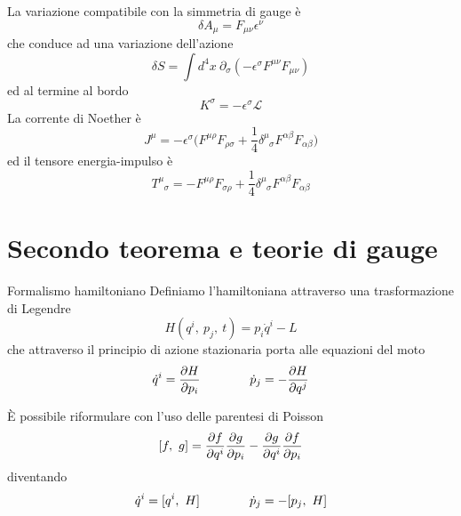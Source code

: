 \begin{frame}
    La variazione compatibile con la simmetria di gauge è 
\begin{equation*}
    \delta A_\mu = F_{\mu\nu} \epsilon^\nu
\end{equation*}
    che conduce ad una variazione dell'azione
\begin{equation*}
    \delta S = \int d^4 x ~\partial_\sigma (-\epsilon^\sigma F^{\mu\nu} F_{\mu\nu})
\end{equation*}
    ed al termine al bordo
\begin{equation*}
    K^\sigma = -\epsilon^\sigma \mathcal L
\end{equation*}
    La corrente di Noether è
\begin{equation*}
    J^\mu = - \epsilon^\sigma \Big ( F^{\mu\rho} F_{\rho\sigma} + \frac{1}{4} \delta^\mu_{\phantom \mu \sigma} F^{\alpha \beta} F_{\alpha \beta} \Big)
\end{equation*}
    ed il tensore energia-impulso è
\begin{equation*}
    T^\mu_{\phantom \mu \sigma} = - F^{\mu\rho} F_{\sigma\rho} + \frac{1}{4} \delta^\mu_{\phantom \mu \sigma} F^{\alpha \beta} F_{\alpha \beta}
\end{equation*}

\end{frame}

\section{Secondo teorema e teorie di gauge}

\begin{frame}{Formalismo hamiltoniano}
    Definiamo l'hamiltoniana attraverso una trasformazione di Legendre 
    \begin{equation*}
        H(q^i, ~p_j, ~t) = p_i \dot q^i - L
    \end{equation*}
    che attraverso il principio di azione stazionaria porta alle equazioni del moto
    \begin{equation*}
        \dot q^i = \frac{\partial H}{\partial p_i} \qquad \qquad \dot p_j = - \frac{\partial H}{\partial q^j}
    \end{equation*}
    
    \hfill

    È possibile riformulare con l'uso delle parentesi di Poisson
    \begin{equation*}
        [f, ~g] = \frac{\partial f}{\partial q^i} \frac{\partial g}{\partial p_i} - \frac{\partial g}{\partial q^i} \frac{\partial f}{\partial p_i}
    \end{equation*}
    diventando 
    \begin{equation*}
        \dot q^i = [q^i, ~H] \qquad \qquad \dot p_j = - [p_j, ~H]
    \end{equation*}
\end{frame}

